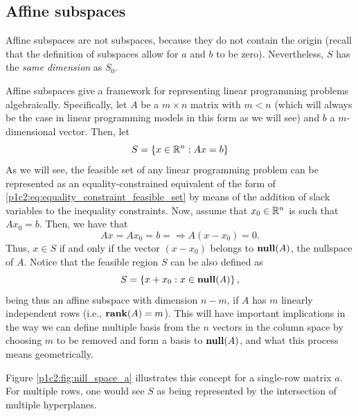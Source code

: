 \subsection{Affine subspaces}

Affine subspaces are not subspaces, because they do not contain the origin (recall that the definition of subspaces allow for $a$ and $b$ to be zero). Nevertheless, $S$ has the \emph{same dimension} as $S_0$.

Affine subspaces give a framework for representing linear programming problems algebraically.  Specifically, let $A$ be a $m \times n$ matrix with $m < n$ (which will always be the case in linear programming models in this form as we will see) and $b$ a $m$-dimensional vector. Then, let 
%
\begin{equation} \label{p1c2:eq:equality_constraint_feasible_set}
	S = \left\{ x \in \mathbb{R}^n : Ax = b \right \}		
\end{equation}
%
As we will see, the feasible set of any linear programming problem can be represented as an equality-constrained equivalent of the form of \eqref{p1c2:eq:equality_constraint_feasible_set} by means of the addition of slack variables to the inequality constraints. Now, assume that $x_0 \in \mathbb{R}^n$ is such that $Ax_0 = b$.  Then, we have that 
%
\begin{equation*}
	Ax = Ax_0 = b =\Rightarrow A(x - x_0) = 0.	
\end{equation*}
%
Thus, $x \in S$ if and only if the vector $(x - x_0)$ belongs to $\mathop{\bf null}(A)$, the nullspace of $A$. Notice that the feasible region $S$ can be also defined as 
%
\begin{equation*}
	S = \left\{ x + x_0 : x \in \mathop{\bf null}(A) \right \},	
\end{equation*}
%
being thus an affine subspace with dimension $n-m$, if $A$ has $m$ linearly independent rows (i.e., $\mathop{\bf rank}(A)=m$). This will have important implications in the way we can define multiple basis from the $n$ vectors in the column space by choosing $m$ to be removed and form a basis to $\mathop{\bf null}(A)$, and what this process means geometrically.

Figure \ref{p1c2:fig:nill_space_a} illustrates this concept for a single-row matrix $a$. For multiple rows, one would see $S$ as being represented by the intersection of multiple hyperplanes.

